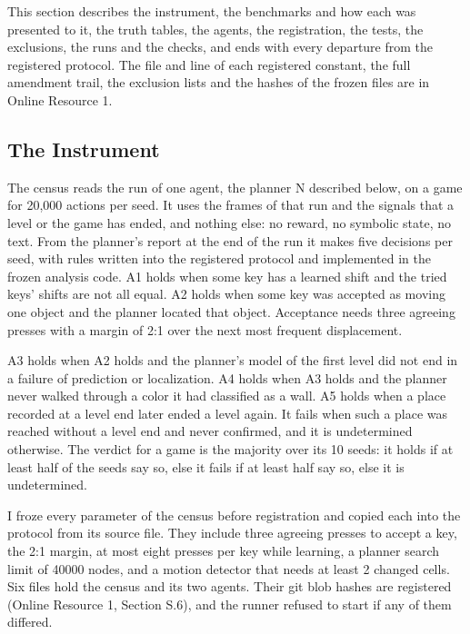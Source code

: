 \documentclass[twocolumn]{svjour3}
\begin{document}
This section describes the instrument, the benchmarks and how each was
presented to it, the truth tables, the agents, the registration, the
tests, the exclusions, the runs and the checks, and ends with every
departure from the registered protocol. The file and line of each
registered constant, the full amendment trail, the exclusion lists and
the hashes of the frozen files are in Online Resource 1.

\subsection{The Instrument}\label{sec:instrument}

The census reads the run of one agent, the planner N described below, on
a game for 20,000 actions per seed. It uses the frames of that run and
the signals that a level or the game has ended, and nothing else: no
reward, no symbolic state, no text. From the planner's report at the end
of the run it makes five decisions per seed, with rules written into the
registered protocol and implemented in the frozen analysis code. A1
holds when some key has a learned shift and the tried keys' shifts are
not all equal. A2 holds when some key was accepted as moving one object
and the planner located that object. Acceptance needs three agreeing
presses with a margin of 2:1 over the next most frequent displacement.

A3 holds when A2 holds and the planner's model of the first level did
not end in a failure of prediction or localization. A4 holds when A3
holds and the planner never walked through a color it had classified as
a wall. A5 holds when a place recorded at a level end later ended a
level again. It fails when such a place was reached without a level end
and never confirmed, and it is undetermined otherwise. The verdict for a
game is the majority over its 10 seeds: it holds if at least half of the
seeds say so, else it fails if at least half say so, else it is
undetermined.

I froze every parameter of the census before registration and copied
each into the protocol from its source file. They include three agreeing
presses to accept a key, the 2:1 margin, at most eight presses per key
while learning, a planner search limit of 40000 nodes, and a motion
detector that needs at least 2 changed cells. Six files hold the census
and its two agents. Their git blob hashes are registered (Online
Resource 1, Section S.6), and the runner refused to start if any of them
differed.
\end{document}

